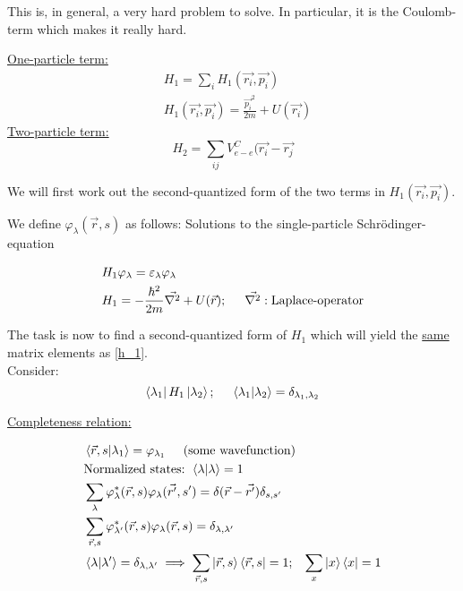 \noindent This is, in general, a very hard problem to solve. In particular, it is the Coulomb-term which makes it really hard.\\
\linebreak

\noindent\uline{One-particle term:}
\begin{align}
	&H_1 = \sum_i H_1 (\vec{r_i}, \vec{p_i})\\
	&H_1 (\vec{r_i}, \vec{p_i}) = \frac{\vec{p_i}^2}{2m} + U(\vec{r_i})
\end{align}
\linebreak
\noindent \uline{Two-particle term:}
\begin{equation}
	H_2 = \sum_{ij} V_{e-e}^C (\vec{r_i}-\vec{r_j}
\end{equation}

\noindent We will first work out the second-quantized form of the two terms in $H_1 (\vec{r_i}, \vec{p_i})$. \\
\linebreak

\noindent We define $\varphi_\lambda ( \vec{r},s)$ as follows:
Solutions to the single-particle Schrödinger-equation

\begin{align}
	&H_1 \varphi_\lambda = \varepsilon_\lambda \varphi_\lambda\\
	&H_1 = -\frac{\hbar^2}{2m} \vec{\laplacian} + U(\vec{r}) ; \hspace{0.5cm} \vec{\laplacian} : \text{Laplace-operator} \label{h_1}
\end{align}

\noindent The task is now to find a second-quantized form of $H_1$ which will yield the \uline{same} matrix elements as \ref{h_1}.\\
\linebreak
\noindent Consider:
\begin{equation}
	\bra{\lambda_1} H_1 \ket{\lambda_2} ; \hspace{0.5cm} \braket{\lambda_1}{\lambda_2} = \delta_{\lambda_1, \lambda_2}
\end{equation}

\noindent \uline{Completeness relation:}

\begin{align}
	&\braket{\vec{r},s}{\lambda_1} = \varphi_{\lambda_{1}} \hspace{0.5cm} \text{(some wavefunction)} \nonumber\\
	&\text{Normalized states: } \braket{\lambda}{\lambda}=1 \nonumber \\
	&\sum_\lambda \varphi_\lambda^* (\vec{r},s) \varphi_\lambda (\vec{r'},s') = \delta(\vec{r}-\vec{r'}) \delta_{s,s'}\\
	&\sum_{\vec{r},s} \varphi_{\lambda'}^* (\vec{r},s) \varphi_\lambda (\vec{r},s) = \delta_{\lambda, \lambda'}\\
	& \braket{\lambda}{\lambda'}= \delta_{\lambda, \lambda'} \implies \sum_{\vec{r},s} \ket{\vec{r},s} \bra{\vec{r},s} = 1 ; \hspace{0.3cm} \sum_x \ket{x}\bra{x}=1
\end{align}

